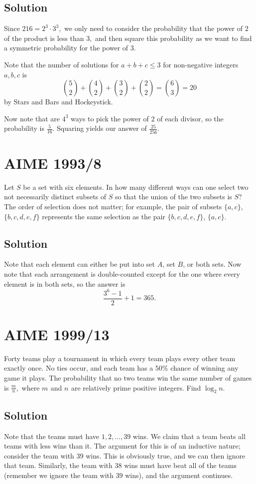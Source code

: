 \documentclass[mast]{lucky}
\begin{document}
\subsection{Solution}

Since $216=2^3\cdot 3^3,$ we only need to consider the probability that the power of $2$ of the product is less than $3,$ and then square this probability as we want to find a symmetric probability for the power of $3.$

Note that the number of solutions for $a+b+c\leq 3$ for non-negative integers $a,b,c$ is
\[\binom{5}{2}+\binom{4}{2}+\binom{3}{2}+\binom{2}{2}=\binom{6}{3}=20\]
by Stars and Bars and Hockeystick.

Now note that are $4^3$ ways to pick the power of $2$ of each divisor, so the probability is $\frac{5}{16}.$ Squaring yields our answer of $\frac{25}{256}.$

\pagebreak\section{AIME 1993/8}

Let $S$ be a set with six elements. In how many different ways can one select two not necessarily distinct subsets of $S$ so that the union of the two subsets is $S$? The order of selection does not matter; for example, the pair of subsets $\{a, c\}$, $\{b, c, d, e, f\}$ represents the same selection as the pair $\{b, c, d, e, f\}$, $\{a, c\}$.

\subsection{Solution}

Note that each element can either be put into set $A$, set $B$, or both sets. Now note that each arrangement is double-counted except for the one where every element is in both sets, so the answer is
\[\frac{3^6-1}{2}+1=365.\]

\pagebreak\section{AIME 1999/13}
Forty teams play a tournament in which every team plays every other team exactly once. No ties occur, and each team has a $50 \%$ chance of winning any game it plays. The probability that no two teams win the same number of games is $\frac mn,$ where $m_{}$ and $n_{}$ are relatively prime positive integers. Find $\log_2 n.$

\subsection{Solution}
Note that the teams must have $1,2,\ldots,39$ wins. We claim that a team beats all teams with less wins than it. The argument for this is of an inductive nature; consider the team with $39$ wins. This is obviously true, and we can then ignore that team. Similarly, the team with $38$ wins must have beat all of the teams (remember we ignore the team with $39$ wins), and the argument continues.
\end{document}
